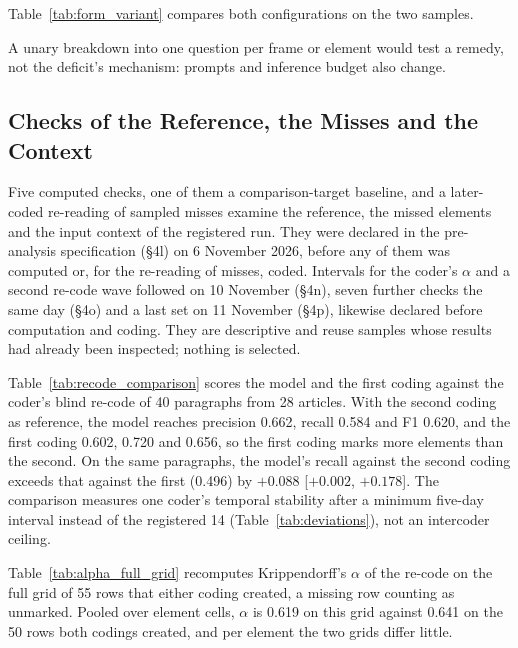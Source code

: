 Table~\ref{tab:form_variant} compares both configurations on the two samples.



A unary breakdown into one question per frame or element \parencite[pp.~2479--2480]{ma2025multilabel} would test a remedy, not the deficit's mechanism: prompts and inference budget also change.

\subsection{Checks of the Reference, the Misses and the Context}\label{app:later_checks}

Five computed checks, one of them a comparison-target baseline, and a later-coded re-reading of sampled misses examine the reference, the missed elements and the input context of the registered run. They were declared in the pre-analysis specification (\S4l) on 6 November 2026, before any of them was computed or, for the re-reading of misses, coded. Intervals for the coder's $\alpha$ and a second re-code wave followed on 10 November (\S4n), seven further checks the same day (\S4o) and a last set on 11 November (\S4p), likewise declared before computation and coding. They are descriptive and reuse samples whose results had already been inspected; nothing is selected.

Table~\ref{tab:recode_comparison} scores the model and the first coding against the coder's blind re-code of 40 paragraphs from 28 articles. With the second coding as reference, the model reaches precision 0.662, recall 0.584 and F1 0.620, and the first coding 0.602, 0.720 and 0.656, so the first coding marks more elements than the second. On the same paragraphs, the model's recall against the second coding exceeds that against the first (0.496) by $+0.088$ [$+0.002$, $+0.178$]. The comparison measures one coder's temporal stability after a minimum five-day interval instead of the registered 14 (Table~\ref{tab:deviations}), not an intercoder ceiling.



Table~\ref{tab:alpha_full_grid} recomputes Krippendorff's $\alpha$ of the re-code on the full grid of 55 rows that either coding created, a missing row counting as unmarked. Pooled over element cells, $\alpha$ is 0.619 on this grid against 0.641 on the 50 rows both codings created, and per element the two grids differ little.



